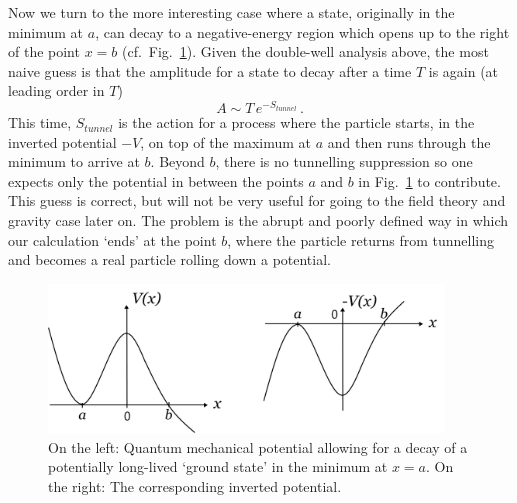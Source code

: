 \documentclass[12pt]{article}
\newcommand{\be}{\begin{equation}}
\newcommand{\ee}{\end{equation}}
\numberwithin{equation}{section}
\begin{document}
Now we turn to the more interesting case where a state, originally in the minimum at $a$, can decay to a negative-energy region which opens up to the right of the point $x=b$ (cf.~Fig.~\ref{decay}). Given the double-well analysis above, the most naive guess is that the amplitude for a state to decay after a time $T$ is again (at leading order in $T$)
\be
A\sim T\,e^{-S_{tunnel}}\,.\label{atun}
\ee
This time, $S_{tunnel}$ is the action for a process where the particle starts, in the inverted potential $-V$, on top of the maximum at $a$ and then runs through the minimum to arrive at $b$. Beyond $b$, there is no tunnelling suppression so one expects only the potential in between the points $a$ and $b$ in Fig.~\ref{decay} to contribute. This guess is correct, but will not be very useful for going to the field theory and gravity case later on. The problem is the abrupt and poorly defined way in which our calculation `ends' at the point $b$, where the particle returns from tunnelling and becomes a real particle rolling down a potential.

\begin{figure}[ht]
\begin{center} 
\includegraphics[width=10.5cm]{decay.png}
\caption{On the left: Quantum mechanical potential allowing for a decay of a potentially long-lived `ground state' in the minimum at $x=a$. On the right: The corresponding inverted potential.}
\label{decay} 
\end{center}
\end{figure}
\end{document}
